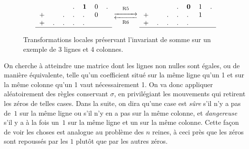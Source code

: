\begin{figure}[hbt]
{\begin{minipage}{0.6\textwidth}
\[
\begin{tabular}{lllllll}
&&&.&\textbf 1&0&. \\
+&&.&.&.&0&\\
+&.&.&.&.&&\\
\hline
\end{tabular}
\mathrel{\mathop{\longrightleftarrows}^{\mathrm{R5}}_{\mathrm{R6}}}
\begin{tabular}{lllllll}
&&&.&\textbf 0&1&. \\
+&&.&.&.&1&\\
+&.&.&.&.&&\\
\hline
\end{tabular}
\]
\end{minipage}}

\caption{Transformations locales préservant l'invariant de somme sur un exemple
  de 3 lignes et 4 colonnes.}

\label{fig:rules}

\end{figure}



On cherche à atteindre une matrice dont les lignes non nulles sont égales, ou de manière équivalente, telle qu'un coefficient situé sur la même ligne qu'un  1 et sur la même colonne qu'un 1 vaut
nécessairement 1. On va donc
appliquer  aléatoirement des  règles  conservant $\sigma$,  en privilégiant  les
mouvements qui retirent les zéros de telles cases. Dans la suite, on dira qu'une
case est \emph{sûre}  s'il n'y a pas de~$1$  sur la même ligne ou s'il  n'y en a
pas sur la même  colonne, et \emph{dangereuse} s'il y a à  la fois un~$1$ sur la
même ligne et un sur la même colonne. Cette façon de voir les choses est analogue au problème des $n$ reines, 
à ceci près que les zéros sont repoussés par les $1$ plutôt que par les autres zéros.


